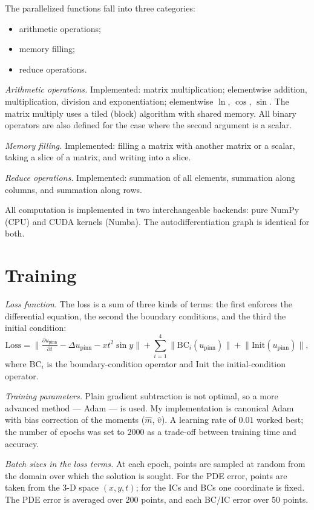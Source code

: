 \documentclass[12pt,a4paper]{article}
\begin{document}
The parallelized functions fall into three categories:
\begin{itemize}
  \item arithmetic operations;
  \item memory filling;
  \item reduce operations.
\end{itemize}

\emph{Arithmetic operations.} Implemented: matrix multiplication; elementwise
addition, multiplication, division and exponentiation; elementwise $\ln$,
$\cos$, $\sin$. The matrix multiply uses a tiled (block) algorithm with shared
memory. All binary operators are also defined for the case where the second
argument is a scalar.

\emph{Memory filling.} Implemented: filling a matrix with another matrix or a
scalar, taking a slice of a matrix, and writing into a slice.

\emph{Reduce operations.} Implemented: summation of all elements, summation
along columns, and summation along rows.

All computation is implemented in two interchangeable backends: pure NumPy (CPU)
and CUDA kernels (Numba). The autodifferentiation graph is identical for both.

\section{Training}

\emph{Loss function.} The loss is a sum of three kinds of terms: the first
enforces the differential equation, the second the boundary conditions, and the
third the initial condition:
\[
\text{Loss} = \Big\| \tfrac{\partial u_{\text{pinn}}}{\partial t} - \Delta u_{\text{pinn}} - x t^2 \sin y \Big\|
 + \sum_{i=1}^{4} \big\| \mathrm{BC}_i(u_{\text{pinn}}) \big\|
 + \big\| \mathrm{Init}(u_{\text{pinn}}) \big\|,
\]
where $\mathrm{BC}_i$ is the boundary-condition operator and $\mathrm{Init}$ the
initial-condition operator.

\emph{Training parameters.} Plain gradient subtraction is not optimal, so a more
advanced method --- Adam --- is used. My implementation is canonical Adam with
bias correction of the moments ($\hat{m}$, $\hat{v}$). A learning rate of $0.01$
worked best; the number of epochs was set to $2000$ as a trade-off between
training time and accuracy.

\emph{Batch sizes in the loss terms.} At each epoch, points are sampled at random
from the domain over which the solution is sought. For the PDE error, points are
taken from the 3-D space $(x, y, t)$; for the ICs and BCs one coordinate is
fixed. The PDE error is averaged over $200$ points, and each BC/IC error over
$50$ points.
\end{document}
